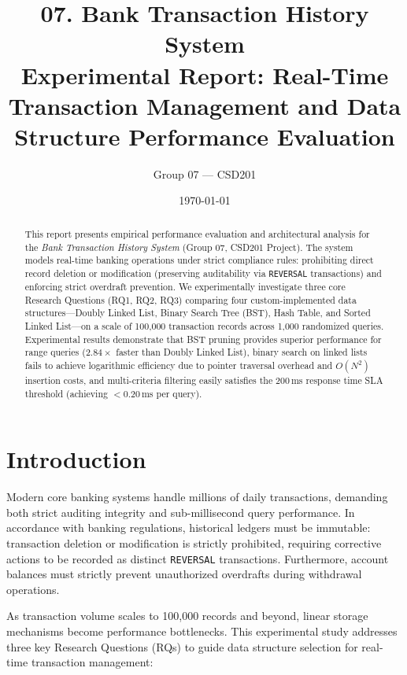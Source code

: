 \documentclass[11pt]{article}
\title{\textbf{07. Bank Transaction History System}\\[4pt]
\large Experimental Report: Real-Time Transaction Management and Data Structure Performance Evaluation}
\author{Group 07 --- CSD201}
\date{\today}
\begin{document}
\maketitle

\begin{abstract}
This report presents empirical performance evaluation and architectural analysis for the \textit{Bank Transaction History System} (Group 07, CSD201 Project). The system models real-time banking operations under strict compliance rules: prohibiting direct record deletion or modification (preserving auditability via \texttt{REVERSAL} transactions) and enforcing strict overdraft prevention. We experimentally investigate three core Research Questions (RQ1, RQ2, RQ3) comparing four custom-implemented data structures---Doubly Linked List, Binary Search Tree (BST), Hash Table, and Sorted Linked List---on a scale of 100,000 transaction records across 1,000 randomized queries. Experimental results demonstrate that BST pruning provides superior performance for range queries ($2.84\times$ faster than Doubly Linked List), binary search on linked lists fails to achieve logarithmic efficiency due to pointer traversal overhead and $O(N^2)$ insertion costs, and multi-criteria filtering easily satisfies the 200\,ms response time SLA threshold (achieving $< 0.20$\,ms per query).
\end{abstract}

\section{Introduction}
Modern core banking systems handle millions of daily transactions, demanding both strict auditing integrity and sub-millisecond query performance. In accordance with banking regulations, historical ledgers must be immutable: transaction deletion or modification is strictly prohibited, requiring corrective actions to be recorded as distinct \texttt{REVERSAL} transactions. Furthermore, account balances must strictly prevent unauthorized overdrafts during withdrawal operations.

As transaction volume scales to 100,000 records and beyond, linear storage mechanisms become performance bottlenecks. This experimental study addresses three key Research Questions (RQs) to guide data structure selection for real-time transaction management:
\end{document}
